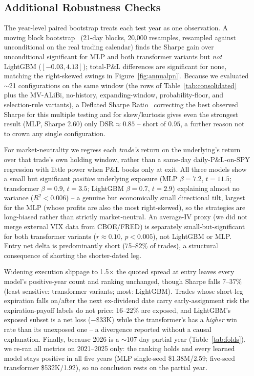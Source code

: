 \documentclass[sigconf,review,anonymous]{acmart}
\begin{document}
\subsection{Additional Robustness Checks}
\label{sec:addl-robustness}
The year-level paired bootstrap treats each test year as one observation. A moving block bootstrap~\cite{kunsch1989} (21-day blocks, 20{,}000 resamples, resampled against unconditional on the real trading calendar) finds the Sharpe gain over unconditional significant for MLP and both transformer variants but \emph{not} LightGBM ($[-0.03, 4.13]$); total-P\&L differences are significant for none, matching the right-skewed swings in Figure~\ref{fig:annualpnl}. Because we evaluated $\sim$21 configurations on the same window (the rows of Table~\ref{tab:consolidated} plus the MV-ALiBi, no-history, expanding-window, probability-floor, and selection-rule variants), a Deflated Sharpe Ratio~\cite{bailey2014deflated} correcting the best observed Sharpe for this multiple testing and for skew/kurtosis gives even the strongest result (MLP, Sharpe 2.60) only $\text{DSR}\approx0.85$ -- short of $0.95$, a further reason not to crown any single configuration.

For market-neutrality we regress each \emph{trade's} return on the underlying's return over that trade's own holding window, rather than a same-day daily-P\&L-on-SPY regression with little power when P\&L books only at exit. All three models show a small but significant \emph{positive} underlying exposure (MLP $\beta{=}7.2$, $t{=}11.5$; transformer $\beta{=}0.9$, $t{=}3.5$; LightGBM $\beta{=}0.7$, $t{=}2.9$) explaining almost no variance ($R^2<0.006$) -- a genuine but economically small directional tilt, largest for the MLP (whose profits are also the most right-skewed), so the strategies are long-biased rather than strictly market-neutral. An average-IV proxy (we did not merge external VIX data from CBOE/FRED) is separately small-but-significant for both transformer variants ($r\approx0.10$, $p<0.005$), not LightGBM or MLP. Entry net delta is predominantly short (75--82\% of trades), a structural consequence of shorting the shorter-dated leg.

Widening execution slippage to 1.5$\times$ the quoted spread at entry leaves every model's positive-year count and ranking unchanged, though Sharpe falls 7--37\% (least sensitive: transformer variants; most: LightGBM). Trades whose short-leg expiration falls on/after the next ex-dividend date carry early-assignment risk the expiration-payoff labels do not price: 16--22\% are exposed, and LightGBM's exposed subset is a net loss ($-\$33$K) while the transformer's has a \emph{higher} win rate than its unexposed one -- a divergence reported without a causal explanation. Finally, because 2026 is a $\sim$107-day partial year (Table~\ref{tab:folds}), we re-ran all metrics on 2021--2025 only: the ranking holds and every learned model stays positive in all five years (MLP single-seed \$1.38M/2.59; five-seed transformer \$532K/1.92), so no conclusion rests on the partial year.
\end{document}

